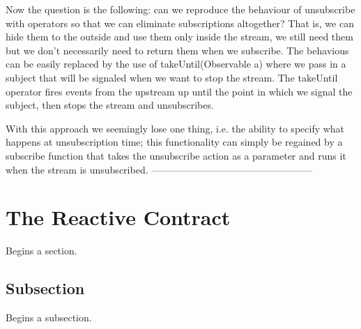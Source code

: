 Now the question is the following: can we reproduce the behaviour of unsubscribe with operators so that we can eliminate subscriptions altogether? That is, we can hide them to the outside and use them only inside the stream, we still need them but we don't necessarily need to return them when we subscribe. The behavious can be easily replaced by the use of takeUntil(Observable a) where we pass in a subject that will be signaled when we want to stop the stream. The takeUntil operator fires events from the upstream up until the point in which we signal the subject, then stops the stream and unsubscribes. 

With this approach we seemingly lose one thing, i.e. the ability to specify what happens at unsubscription time; this functionality can simply be regained by a subscribe function that takes the unsubscribe action as a parameter and runs it when the stream is unsubscribed.
--------------------------------------------------

\section{The Reactive Contract}
\label{sec:sec01}

Begins a section.

\subsection{Subsection}
\label{subsec:subsec01}

Begins a subsection.

\listoftodos

